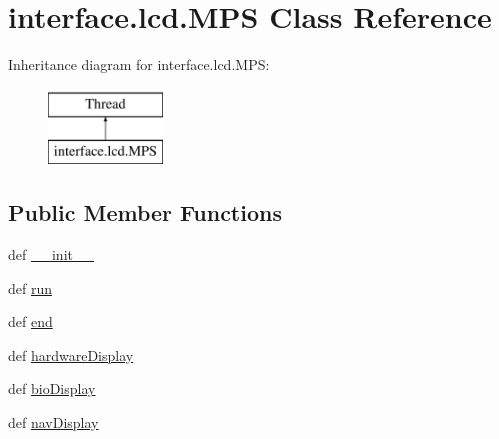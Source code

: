 \hypertarget{classinterface_1_1lcd_1_1MPS}{}\section{interface.\+lcd.\+M\+P\+S Class Reference}
\label{classinterface_1_1lcd_1_1MPS}
Inheritance diagram for interface.\+lcd.\+M\+P\+S\+:\begin{figure}[H]
\begin{center}
\leavevmode
\includegraphics[height=2.000000cm]{classinterface_1_1lcd_1_1MPS}
\end{center}
\end{figure}
\subsection*{Public Member Functions}
\begin{DoxyCompactItemize}
\item 
def \hyperlink{classinterface_1_1lcd_1_1MPS_a52eee073eb72cffe7865fcc59c83bf95}{\+\_\+\+\_\+init\+\_\+\+\_\+}
\item 
def \hyperlink{classinterface_1_1lcd_1_1MPS_a7c696e6242aa5e524a426ce73a8a8050}{run}
\item 
def \hyperlink{classinterface_1_1lcd_1_1MPS_ad9481e02c1fc887aa940144141074bc3}{end}
\item 
def \hyperlink{classinterface_1_1lcd_1_1MPS_a56a76849d7a11e2d4768e8813a6e6c19}{hardware\+Display}
\item 
def \hyperlink{classinterface_1_1lcd_1_1MPS_aa5ae91eb14143474a31fac7754c41228}{bio\+Display}
\item 
def \hyperlink{classinterface_1_1lcd_1_1MPS_a8ea7992a675b520b586cb53d276c6f54}{nav\+Display}
\end{DoxyCompactItemize}
